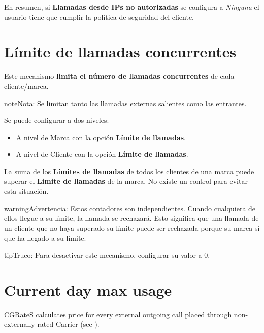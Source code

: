 \documentclass[letterpaper,10pt,spanish]{sphinxmanual}
\begin{document}
En resumen, si \textbf{Llamadas desde IPs no autorizadas} se configura a \emph{Ninguna} el usuario tiene que cumplir la política de seguridad del cliente.


\section{Límite de llamadas concurrentes}
\label{security_and_maintenance/security/concurrent_call_limit::doc}\label{security_and_maintenance/security/concurrent_call_limit:concurrent-call-limit}
Este mecanismo \textbf{limita el número de llamadas concurrentes} de cada cliente/marca.

\begin{notice}{note}{Nota:}
Se limitan tanto las llamadas externas salientes como las entrantes.
\end{notice}

Se puede configurar a dos niveles:
\begin{itemize}
\item {} 
A nivel de Marca con la opción \textbf{Límite de llamadas}.

\item {} 
A nivel de Cliente con la opción \textbf{Límite de llamadas}.

\end{itemize}

La suma de los \textbf{Límites de llamadas} de todos los clientes de una marca puede superar el \textbf{Limite de llamadas} de la marca. No existe un control para evitar esta situación.

\begin{notice}{warning}{Advertencia:}
Estos contadores son independientes. Cuando cualquiera de ellos llegue a su límite, la llamada se rechazará. Esto significa que una llamada de un cliente que no haya superado su límite puede ser rechazada porque su marca sí que ha llegado a su límite.
\end{notice}

\begin{notice}{tip}{Truco:}
Para desactivar este mecanismo, configurar su valor a 0.
\end{notice}


\section{Current day max usage}
\label{security_and_maintenance/security/current_day_max_usage:current-day-max-usage}\label{security_and_maintenance/security/current_day_max_usage::doc}
CGRateS calculates price for every external outgoing call placed through non-externally-rated Carrier (see {\hyperref[administration_portal/brand/billing/index:billing]{}}).
\end{document}
